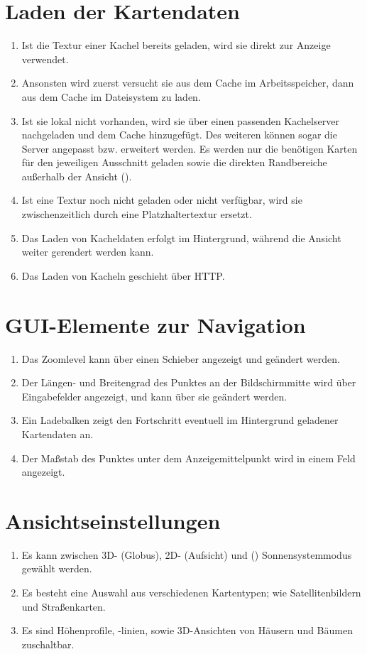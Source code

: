 \documentclass[10pt]{scrreprt}
\begin{document}
\section{Laden der Kartendaten}
\begin{enumerate}[resume,leftmargin=2cm]
\item Ist die Textur einer Kachel bereits geladen, wird sie direkt zur Anzeige verwendet.
\item \W Ansonsten wird zuerst versucht sie aus dem Cache im Arbeitsspeicher, dann aus dem Cache im Dateisystem zu laden.
\item Ist sie lokal nicht vorhanden, wird sie über einen passenden Kachelserver nachgeladen und dem Cache hinzugefügt. Des weiteren können sogar die Server angepasst bzw. erweitert werden. Es werden nur die benötigen Karten für den jeweiligen Ausschnitt geladen sowie die direkten Randbereiche außerhalb der Ansicht (\W).
\item Ist eine Textur noch nicht geladen oder nicht verfügbar, wird sie zwischenzeitlich durch eine Platzhaltertextur ersetzt.
\item Das Laden von Kacheldaten erfolgt im Hintergrund, während die Ansicht weiter gerendert werden kann.
\item Das Laden von Kacheln geschieht über HTTP.
\end{enumerate}
\section{GUI-Elemente zur Navigation}
\begin{enumerate}[leftmargin=2cm,resume]
\item Das Zoomlevel kann über einen Schieber angezeigt und geändert werden.
\item Der Längen- und Breitengrad des Punktes an der Bildschirmmitte wird über Eingabefelder angezeigt, und kann über sie geändert werden.
\item Ein Ladebalken zeigt den Fortschritt eventuell im Hintergrund geladener Kartendaten an.
\item Der Maßstab des Punktes unter dem Anzeigemittelpunkt wird in einem Feld angezeigt.
\end{enumerate}

\section{Ansichtseinstellungen}
\begin{enumerate}[leftmargin=2cm,resume]
\item Es kann zwischen 3D- (Globus), 2D- (Aufsicht) und (\W) Sonnensystemmodus gewählt werden.
\item Es besteht eine Auswahl aus verschiedenen Kartentypen; wie Satellitenbildern und Straßenkarten.
\item \W Es sind Höhenprofile, -linien, sowie 3D-Ansichten von Häusern und 
Bäumen zuschaltbar.
\end{enumerate}
\end{document}
